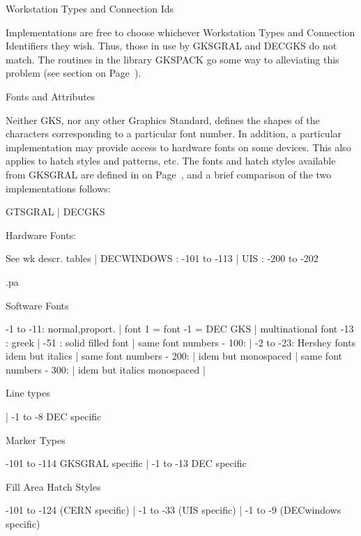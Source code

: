 \begin{UL}
\item Workstation Types and Connection Ids
 
Implementations are free to choose whichever Workstation Types and
Connection Identifiers they wish. Thus, those in use by GKSGRAL and
DECGKS do not match. The routines in the library GKSPACK go some way to
alleviating this problem (see section on Page~\pageref{sec:gkspref}).
\item Fonts and Attributes
 
Neither GKS, nor any other Graphics Standard, defines the shapes of
the characters corresponding to a particular font number. In addition,
a particular implementation may provide access to hardware fonts
on some devices. This also applies to hatch styles and patterns, etc.
The fonts and hatch styles available from GKSGRAL are defined in
on Page~\pageref{sec:impref1}, and a brief comparison of the two implementations
follows:
\begin{XMP}
   GTSGRAL                    |         DECGKS
\end{XMP}
 
Hardware Fonts:
\begin{XMP}
See wk descr. tables          |  DECWINDOWS : -101 to -113
                              |  UIS        : -200 to -202
\end{XMP}
.pa
 
Software Fonts
\begin{XMP}
-1 to -11: normal,proport.    |  font 1 = font -1 = DEC GKS
                              |  multinational font
-13      : greek              |
-51      : solid filled font  |
same font numbers - 100:      |  -2 to -23: Hershey fonts
  idem but italics            |
same font numbers - 200:      |
  idem but monospaced         |
same font numbers - 300:      |
  idem but italics monospaced |
\end{XMP}
 
Line types
\begin{XMP}
                              |  -1 to -8  DEC specific
\end{XMP}
 
Marker Types
\begin{XMP}
-101 to -114 GKSGRAL specific |  -1 to -13 DEC specific
\end{XMP}
 
Fill Area Hatch Styles
\begin{XMP}
 -101 to -124 (CERN specific) |  -1 to -33 (UIS specific)
                              |  -1 to  -9 (DECwindows specific)
\end{XMP}
 

\end{UL}
